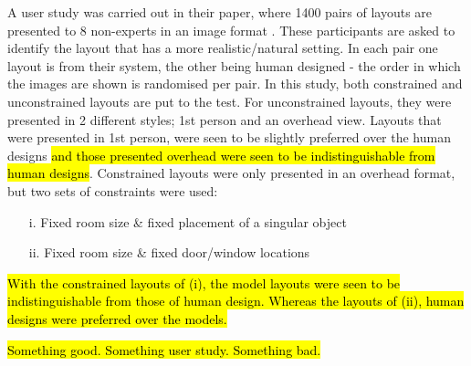 A user study was carried out in their paper, where 1400 pairs of layouts are presented to 8 non-experts in an image format \cite{constrained-layouts}. These participants are asked to identify the layout that has a more realistic/natural setting. In each pair one layout is from their system, the other being human designed - the order in which the images are shown is randomised per pair.
In this study, both constrained and unconstrained layouts are put to the test. For unconstrained layouts, they were presented in 2 different styles; 1st person and an overhead view. Layouts that were presented in 1st person, were seen to be slightly preferred over the human designs \hl{and those presented overhead were seen to be indistinguishable from human designs}.
Constrained layouts were only presented in an overhead format, but two sets of constraints were used:
\begin{enumerate}
    \item[i.] Fixed room size \& fixed placement of a singular object
    \item[ii.] Fixed room size \& fixed door/window locations
\end{enumerate}
\hl{With the constrained layouts of (i), the model layouts were seen to be indistinguishable from those of human design. Whereas the layouts of (ii), human designs were preferred over the models.}

\hl{Something good. Something user study. Something bad.}

\bigskip
